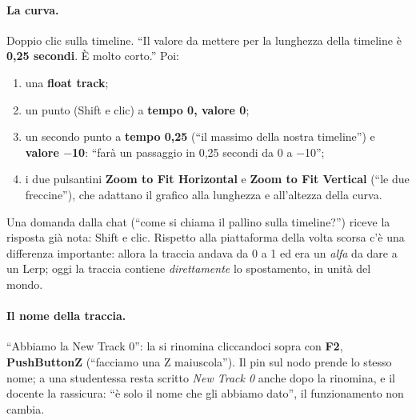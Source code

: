 \paragraph{La curva.} Doppio clic sulla timeline. ``Il valore da mettere per la
lunghezza della timeline è \textbf{0,25 secondi}. È molto corto.'' Poi:
\begin{enumerate}
  \item una \textbf{float track};
  \item un punto (Shift e clic) a \textbf{tempo 0, valore 0};
  \item un secondo punto a \textbf{tempo 0,25} (``il massimo della nostra timeline'') e
        \textbf{valore $-$10}: ``farà un passaggio in 0,25 secondi da 0 a $-$10'';
  \item i due pulsantini \textbf{Zoom to Fit Horizontal} e \textbf{Zoom to Fit
        Vertical} (``le due freccine''), che adattano il grafico alla lunghezza e
        all'altezza della curva.
\end{enumerate}
Una domanda dalla chat (``come si chiama il pallino sulla timeline?'') riceve la risposta
già nota: Shift e clic. Rispetto alla piattaforma della volta scorsa c'è una differenza
importante: allora la traccia andava da 0 a 1 ed era un \emph{alfa} da dare a un Lerp;
oggi la traccia contiene \emph{direttamente} lo spostamento, in unità del mondo.

\paragraph{Il nome della traccia.} ``Abbiamo la New Track 0'': la si rinomina cliccandoci
sopra con \textbf{F2}, \textbf{PushButtonZ} (``facciamo una Z maiuscola''). Il pin sul
nodo prende lo stesso nome; a una studentessa resta scritto \emph{New Track 0} anche
dopo la rinomina, e il docente la rassicura: ``è solo il nome che gli abbiamo dato'', il
funzionamento non cambia.

